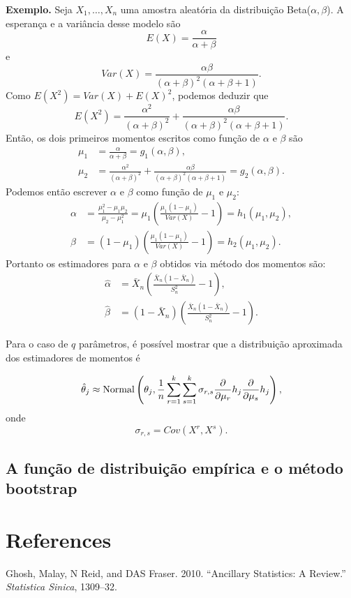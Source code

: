 \documentclass[
  letterpaper,
  DIV=11,
  numbers=noendperiod]{scrartcl}
\newlength{\cslhangindent}
\newenvironment{CSLReferences}[2] %
 {\begin{list}{}{%
  \setlength{\itemindent}{0pt}
  \setlength{\leftmargin}{0pt}
  \setlength{\parsep}{0pt}
  \ifodd #1
   \setlength{\leftmargin}{\cslhangindent}
   \setlength{\itemindent}{-1\cslhangindent}
  \fi
  \setlength{\itemsep}{#2\baselineskip}}}
 {\end{list}}
\begin{document}
\textbf{Exemplo.} Seja \(X_1,\ldots,X_n\) uma amostra aleatória da
distribuição Beta(\(\alpha,\beta\)). A esperança e a variância desse
modelo são \[E(X)=\frac{\alpha}{\alpha+\beta}\] e
\[Var(X)=\frac{\alpha\beta}{(\alpha+\beta)^2(\alpha+\beta+1)}.\] Como
\(E(X^2)=Var(X)+E(X)^2\), podemos deduzir que
\[E(X^2)=\frac{\alpha^2}{(\alpha+\beta)^2}+\frac{\alpha\beta}{(\alpha+\beta)^2(\alpha+\beta+1)}.\]
Então, os dois primeiros momentos escritos como função de \(\alpha\) e
\(\beta\) são
\[\begin{align}\mu_1&=\frac{\alpha}{\alpha+\beta}=g_1(\alpha,\beta),\\
\mu_2&=\frac{\alpha^2}{(\alpha+\beta)^2}+\frac{\alpha\beta}{(\alpha+\beta)^2(\alpha+\beta+1)}=g_2(\alpha,\beta).\end{align}\]
Podemos então escrever \(\alpha\) e \(\beta\) como função de \(\mu_1\) e
\(\mu_2\):
\[\begin{align}\alpha&=\frac{\mu_1^2-\mu_1\mu_2}{\mu_2-\mu_1^2}=\mu_1\left(\frac{\mu_1(1-\mu_1)}{Var(X)}-1\right)=h_1(\mu_1,\mu_2),\\
\beta&=(1-\mu_1)\left(\frac{\mu_1(1-\mu_1)}{Var(X)}-1\right)=h_2(\mu_1,\mu_2).\end{align}\]
Portanto os estimadores para \(\alpha\) e \(\beta\) obtidos via método
dos momentos são:
\[\begin{align}\hat{\alpha}&=\bar{X}_n\left(\frac{\bar{X}_n(1-\bar{X}_n)}{S_n^2}-1\right),\\
\hat{\beta}&=(1-\bar{X}_n)\left(\frac{\bar{X}_n(1-\bar{X}_n)}{S_n^2}-1\right).\end{align}\]

Para o caso de \(q\) parâmetros, é possível mostrar que a distribuição
aproximada dos estimadores de momentos é

\[\hat{\theta}_j\approx \hbox{Normal}\left(\theta_j,\frac{1}{n}\sum_{r=1}^k\sum_{s=1}^k\sigma_{r,s}\frac{\partial}{\partial\mu_r}h_j\frac{\partial}{\partial\mu_s}h_j\right),\]
onde \[\sigma_{r,s}=Cov(X^r,X^s).\]

\section{A função de distribuição empírica e o método
bootstrap}\label{a-funuxe7uxe3o-de-distribuiuxe7uxe3o-empuxedrica-e-o-muxe9todo-bootstrap}


\chapter*{References}\label{references}


\label{refs}
\begin{CSLReferences}{1}{0}
Ghosh, Malay, N Reid, and DAS Fraser. 2010. {``Ancillary Statistics: A
Review.''} \emph{Statistica Sinica}, 1309--32.

\end{CSLReferences}
\end{document}
